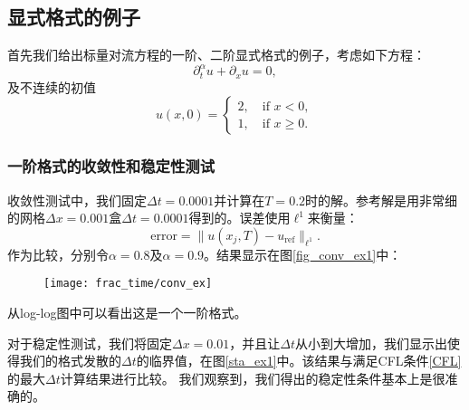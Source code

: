 \subsection{显式格式的例子}
首先我们给出标量对流方程的一阶、二阶显式格式的例子，考虑如下方程：
\begin{equation}
\partial_t^\alpha u+\partial_x u = 0,
\end{equation}
及不连续的初值
\begin{equation}
u(x, 0) = \begin{cases}
2, \quad \mbox{if } x < 0, \\
1, \quad \mbox{if } x \geq 0.
\end{cases}
\end{equation}

\subsubsection{一阶格式的收敛性和稳定性测试}	
收敛性测试中，我们固定$\Delta t = 0.0001$并计算在$T = 0.2$时的解。参考解是用非常细的网格$\Delta x = 0.001$盒$\Delta t = 0.0001$得到的。误差使用$\ell^1$来衡量：
\begin{equation}
\mathrm{error} = \|u(x_j, T) - u_{\mathrm{ref}}\|_{\ell^1}.
\end{equation}
作为比较，分别令$\alpha = 0.8$及$\alpha = 0.9$。结果显示在图\ref{fig_conv_ex1}中：
\begin{figure}[htbp]
	\centering
	\texttt{[image: frac\_time/conv\_ex]}
\end{figure}
从log-log图中可以看出这是一个一阶格式。

对于稳定性测试，我们将固定$ \Delta x = 0.01 $，并且让$ \Delta t $从小到大增加，我们显示出使得我们的格式发散的$ \Delta t $的临界值，在图\ref{sta_ex1}中。该结果与满足CFL条件\eqref{CFL}的最大$ \Delta t $计算结果进行比较。 我们观察到，我们得出的稳定性条件基本上是很准确的。

